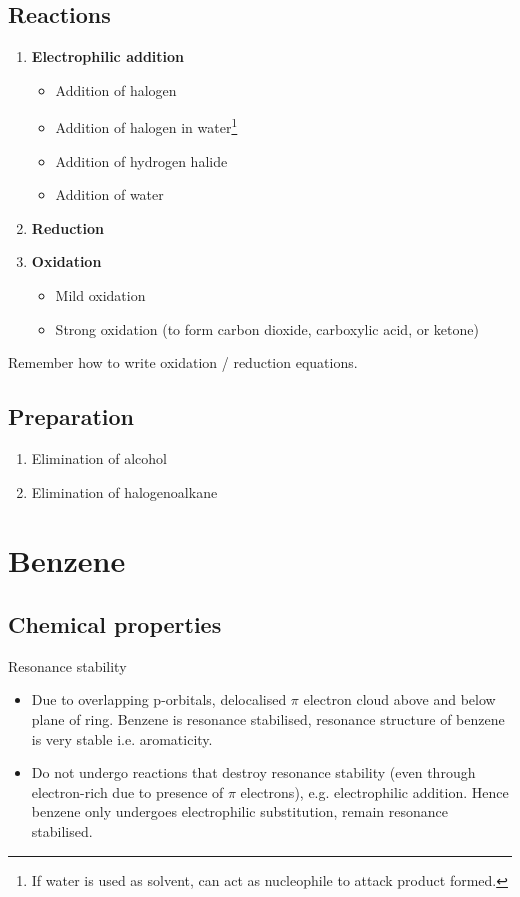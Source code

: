 \documentclass[12pt,a4 paper]{article}
\begin{document}
\subsection{Reactions}
\begin{enumerate}
\item \textbf{Electrophilic addition}
	\begin{itemize}
	\item Addition of halogen
	\item Addition of halogen in water\footnote{If water is used as solvent,  can act as nucleophile to attack product formed.}
	\item Addition of hydrogen halide
	\item Addition of water
	\end{itemize}
\item \textbf{Reduction}
\item \textbf{Oxidation}
	\begin{itemize}
	\item Mild oxidation
	\item Strong oxidation (to form carbon dioxide, carboxylic acid, or ketone)
	\end{itemize}
\end{enumerate}

\begin{remark}
Remember how to write oxidation / reduction equations.
\end{remark}

\subsection{Preparation}
\begin{enumerate}
\item Elimination of alcohol
\item Elimination of halogenoalkane
\end{enumerate}
\pagebreak

\section{Benzene}
\subsection*{Chemical properties}
Resonance stability
\begin{itemize}
\item Due to overlapping p-orbitals, delocalised $\pi$ electron cloud above and below plane of ring. Benzene is resonance stabilised, resonance structure of benzene is very stable i.e. aromaticity.
\item Do not undergo reactions that destroy resonance stability (even through electron-rich due to presence of $\pi$ electrons), e.g. electrophilic addition. Hence benzene only undergoes electrophilic substitution, remain resonance stabilised.
\end{itemize}
\end{document}
